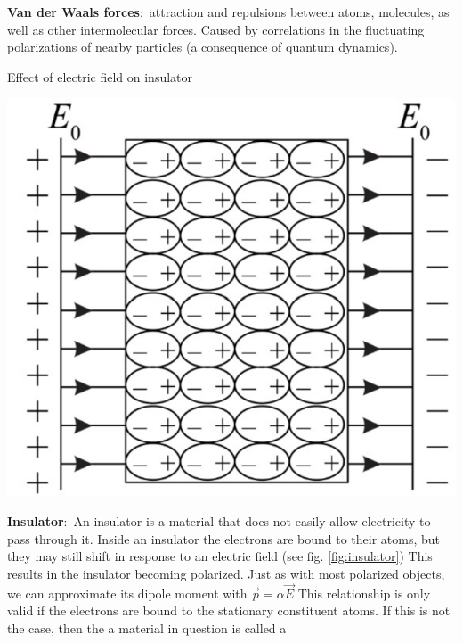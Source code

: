 \documentclass[nobib]{tufte-handout}
\newcommand{\defn}[2]{\noindent\textbf{#1}:\ #2}
\begin{document}
\defn{Van der Waals forces}{attraction and repulsions 
between atoms, molecules, as well as other intermolecular 
forces. Caused by correlations in the 
fluctuating polarizations of nearby particles 
(a consequence of quantum dynamics)}.
\begin{marginfigure}
    \caption{Effect of electric field on insulator}
    \center
    \includegraphics[width=\textwidth/2]{images/insulator.png}
    \label{fig:insulator}
\end{marginfigure}
\defn{Insulator}{An insulator is a material that does not 
easily allow electricity to pass through it}. Inside
an insulator the electrons are bound to their atoms, but they
may still shift in response to an electric field (see fig. \ref{fig:insulator})
This results in the insulator becoming polarized. 
Just as with most polarized objects, we can approximate 
its dipole moment with $\vec{p} = \alpha \vec{E}$
This relationship is only valid if the electrons 
are bound to the stationary constituent atoms. 
If this is not the case, then the a material in 
question is called a
\end{document}
